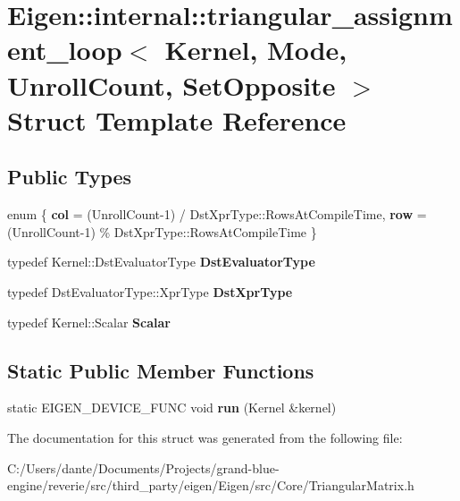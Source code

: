 \hypertarget{struct_eigen_1_1internal_1_1triangular__assignment__loop}{}\section{Eigen\+::internal\+::triangular\+\_\+assignment\+\_\+loop$<$ Kernel, Mode, Unroll\+Count, Set\+Opposite $>$ Struct Template Reference}
\label{struct_eigen_1_1internal_1_1triangular__assignment__loop}
\subsection*{Public Types}
\begin{DoxyCompactItemize}
\item 
\mbox{\label{struct_eigen_1_1internal_1_1triangular__assignment__loop_a75c4d6590f900c44a989cc555e1b9e23}} 
enum \{ {\bfseries col} = (Unroll\+Count-\/1) / Dst\+Xpr\+Type\+::Rows\+At\+Compile\+Time, 
{\bfseries row} = (Unroll\+Count-\/1) \% Dst\+Xpr\+Type\+::Rows\+At\+Compile\+Time
 \}
\item 
\mbox{\label{struct_eigen_1_1internal_1_1triangular__assignment__loop_ad3b34b01e072c973b4ae85356f9984a1}} 
typedef Kernel\+::\+Dst\+Evaluator\+Type {\bfseries Dst\+Evaluator\+Type}
\item 
\mbox{\label{struct_eigen_1_1internal_1_1triangular__assignment__loop_ab2f24d7211c8c3c2f3dad07ebfff4848}} 
typedef Dst\+Evaluator\+Type\+::\+Xpr\+Type {\bfseries Dst\+Xpr\+Type}
\item 
\mbox{\label{struct_eigen_1_1internal_1_1triangular__assignment__loop_a47a7999acf8ec526cce8fb63c6c49ab9}} 
typedef Kernel\+::\+Scalar {\bfseries Scalar}
\end{DoxyCompactItemize}
\subsection*{Static Public Member Functions}
\begin{DoxyCompactItemize}
\item 
\mbox{\label{struct_eigen_1_1internal_1_1triangular__assignment__loop_adac5998cbef1f81240d3dfbdc46fa269}} 
static E\+I\+G\+E\+N\+\_\+\+D\+E\+V\+I\+C\+E\+\_\+\+F\+U\+NC void {\bfseries run} (Kernel \&kernel)
\end{DoxyCompactItemize}


The documentation for this struct was generated from the following file\+:\begin{DoxyCompactItemize}
\item 
C\+:/\+Users/dante/\+Documents/\+Projects/grand-\/blue-\/engine/reverie/src/third\+\_\+party/eigen/\+Eigen/src/\+Core/Triangular\+Matrix.\+h\end{DoxyCompactItemize}
